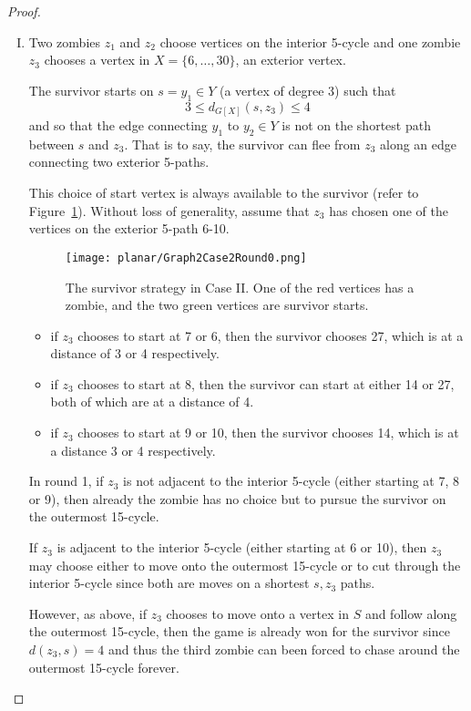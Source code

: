 \begin{proof}
\begin{enumerate}[I.]
\item Two zombies $z_1$ and $z_2$ choose vertices on the interior 5-cycle and one zombie $z_3$ chooses a vertex in $X = \{ 6, \dots, 30 \}$,
an exterior vertex.\label{planar case 2}

The survivor starts on $s = y_1 \in Y$  (a vertex of degree 3) such that
\[3 \leq d_{G[X]}(s, z_3) \leq 4\]
 and so that the edge connecting $y_1$ to $y_2 \in Y$
is not on the shortest path between $s$ and $z_3$. That is to say, the survivor can flee from $z_3$ along an edge connecting two exterior 5-paths.

This choice of start vertex is always available to the survivor (refer to Figure~\ref{fig:planarG2C2R0}). Without loss of generality, assume that $z_3$ has chosen one of the vertices on the
exterior 5-path 6-10.

\begin{figure}
\centering
\texttt{[image: planar/Graph2Case2Round0.png]}
\caption{The survivor strategy in Case II. One of the red vertices has a zombie, and the two green vertices are survivor starts. \label{fig:planarG2C2R0}}
\end{figure}

\begin{itemize}
\item if $z_3$ chooses to start at 7 or 6, then the survivor chooses 27, which is at a distance of 3 or 4 respectively.
\item if $z_3$ chooses to start at 8, then the survivor can start at either 14 or 27, both of which are at a distance of 4.
\item if $z_3$ chooses to start at 9 or 10, then the survivor chooses 14, which is at a distance 3 or 4 respectively.
\end{itemize}

In round 1, if $z_3$ is not adjacent to the interior 5-cycle (either starting at 7, 8 or 9), then already the zombie has no choice but to pursue the survivor
on the outermost 15-cycle.

If $z_3$ is adjacent to the interior 5-cycle (either starting at 6 or 10), then $z_3$ may choose either to move onto the outermost 15-cycle or to cut through the interior 5-cycle since both are moves on a shortest $s,z_3$ paths.

However, as above, if $z_3$ chooses to move onto a vertex in $S$ and follow along the outermost 15-cycle, then the game is already won for the survivor since
$d(z_3, s) = 4$ and thus the third zombie can been forced to chase around the outermost 15-cycle forever.


\end{enumerate}
\end{proof}
